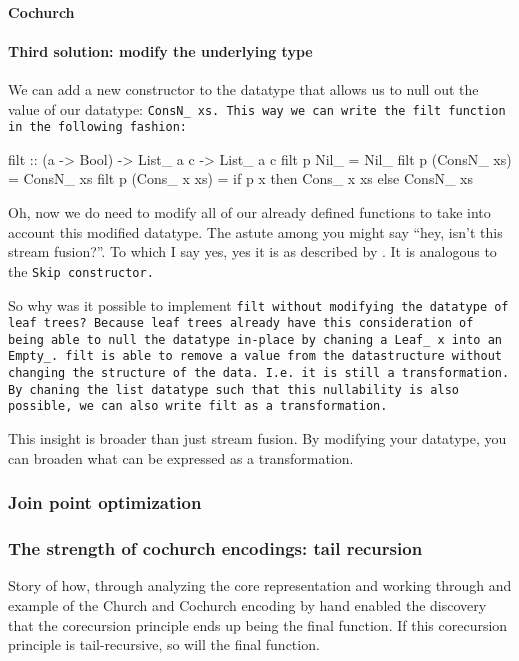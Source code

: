 
\paragraph{Cochurch}

\paragraph{Third solution: modify the underlying type}
We can add a new constructor to the datatype that allows us to null out the value of our datatype: \tt{ConsN\_ xs}.
This way we can write the \tt{filt} function in the following fashion:
\begin{code}
filt :: (a -> Bool) -> List_ a c -> List_ a c
filt p Nil_ = Nil_
filt p (ConsN_ xs) = ConsN_ xs
filt p (Cons_ x xs) = if p x then Cons_ x xs else ConsN_ xs
\end{code}
Oh, now we do need to modify all of our already defined functions to take into account this modified datatype.
The astute among you might say ``hey, isn't this stream fusion?''.
To which I say yes, yes it is as described by \cite{Coutts2007}.
It is analogous to the \tt{Skip} constructor.

So why was it possible to implement \tt{filt} without modifying the datatype of leaf trees?
Because leaf trees already have this consideration of being able to null the datatype in-place by chaning a \tt{Leaf\_ x} into an \tt{Empty\_}.
\tt{filt} is able to remove a value from the datastructure without changing the structure of the data. I.e. it is still a transformation.
By chaning the list datatype such that this nullability is also possible, we can also write \tt{filt} as a transformation.

This insight is broader than just stream fusion.
By modifying your datatype, you can broaden what can be expressed as a transformation.


\subsubsection{Join point optimization}\label{sec:join}
\subsubsection{The strength of cochurch encodings: tail recursion}\label{sec:tail}
Story of how, through analyzing the core representation and working through and example of the Church and Cochurch encoding by hand enabled the discovery that the corecursion principle ends up being the final function.
If this corecursion principle is tail-recursive, so will the final function.

